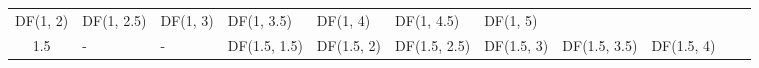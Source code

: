 \documentclass{article}
\begin{document}
\begin{longtable}[c]{@{}cllllllllll@{}}
\begin{minipage}[t]{0.13\columnwidth}
DF(1, 2)
\strut\end{minipage} &
\begin{minipage}[t]{0.15\columnwidth}\raggedright\strut
DF(1, 2.5)
\strut\end{minipage} &
\begin{minipage}[t]{0.13\columnwidth}\raggedright\strut
DF(1, 3)
\strut\end{minipage} &
\begin{minipage}[t]{0.15\columnwidth}\raggedright\strut
DF(1, 3.5)
\strut\end{minipage} &
\begin{minipage}[t]{0.13\columnwidth}\raggedright\strut
DF(1, 4)
\strut\end{minipage} &
\begin{minipage}[t]{0.15\columnwidth}\raggedright\strut
DF(1, 4.5)
\strut\end{minipage} &
\begin{minipage}[t]{0.13\columnwidth}\raggedright\strut
DF(1, 5)
\strut\end{minipage}\tabularnewline
\begin{minipage}[t]{0.08\columnwidth}\centering\strut
1.5
\strut\end{minipage} &
\begin{minipage}[t]{0.15\columnwidth}\raggedright\strut
-
\strut\end{minipage} &
\begin{minipage}[t]{0.13\columnwidth}\raggedright\strut
-
\strut\end{minipage} &
\begin{minipage}[t]{0.15\columnwidth}\raggedright\strut
DF(1.5, 1.5)
\strut\end{minipage} &
\begin{minipage}[t]{0.13\columnwidth}\raggedright\strut
DF(1.5, 2)
\strut\end{minipage} &
\begin{minipage}[t]{0.15\columnwidth}\raggedright\strut
DF(1.5, 2.5)
\strut\end{minipage} &
\begin{minipage}[t]{0.13\columnwidth}\raggedright\strut
DF(1.5, 3)
\strut\end{minipage} &
\begin{minipage}[t]{0.15\columnwidth}\raggedright\strut
DF(1.5, 3.5)
\strut\end{minipage} &
\begin{minipage}[t]{0.13\columnwidth}\raggedright\strut
DF(1.5, 4)
\strut\end{minipage} &

\end{longtable}
\end{document}

